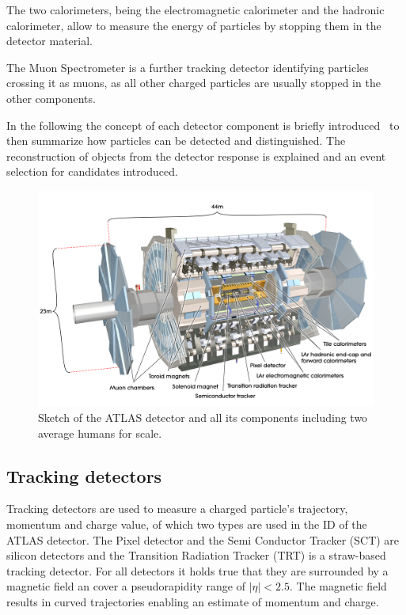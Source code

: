 The two calorimeters, being the electromagnetic calorimeter and the hadronic calorimeter, allow to measure the energy of particles by stopping them in the detector material.

The Muon Spectrometer is a further tracking detector identifying particles crossing it as muons, as all other charged particles are usually stopped in the other components.

In the following the concept of each detector component is briefly introduced~\cite{wermes} to then summarize how particles can be detected and distinguished. The reconstruction of objects from the detector response is explained and an event selection for \tW candidates introduced.



\begin{figure}[htbp]
  \centering
  \includegraphics[scale=0.15]{figures_LHC/atlas-detector}
  \caption[Sketch of the ATLAS detector]{Sketch of the ATLAS detector and all its components including two average humans for scale.~\cite{Pequenao:1095924}}
  \label{fig:atlas}
\end{figure}


\subsection{Tracking detectors}

Tracking detectors are used to measure a charged particle's trajectory, momentum and charge value, of which two types are used in the ID of the ATLAS detector. The Pixel detector and the Semi Conductor Tracker (SCT) are silicon detectors and the Transition Radiation Tracker (TRT) is a straw-based tracking detector. For all detectors it holds true that they are surrounded by a magnetic field an cover a pseudorapidity range of $|\eta| < 2.5$. The magnetic field results in curved trajectories enabling an estimate of momentum and charge.\cite{leo}

